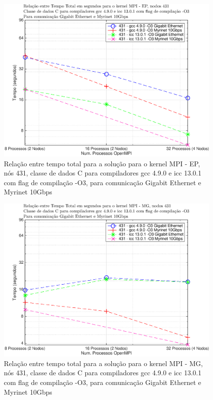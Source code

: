 \documentclass[conference,compsoc]{IEEEtran}
\begin{document}
\begin{figure}[H]
\centering
\includegraphics[width=1.1\columnwidth]{EPS/MPI/431/mpi_431_ep.eps}
\caption{Relação entre tempo total para a solução para o kernel MPI - EP, nós 431, classe de dados C para compiladores gcc 4.9.0 e icc 13.0.1 com flag de compilação  -O3, para comunicação Gigabit Ethernet e Myrinet 10Gbps}
\label{tempo_mpi_ep_431}
\end{figure}


\begin{figure}[H]
\centering
\includegraphics[width=1.1\columnwidth]{EPS/MPI/431/mpi_431_mg.eps}
\caption{Relação entre tempo total para a solução para o kernel MPI - MG, nós 431, classe de dados C para compiladores gcc 4.9.0 e icc 13.0.1 com flag de compilação  -O3, para comunicação Gigabit Ethernet e Myrinet 10Gbps}
\label{tempo_mpi_mg_431}
\end{figure}
\end{document}
